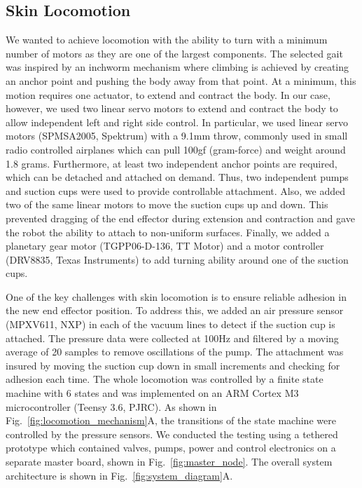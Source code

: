 \subsection{Skin Locomotion}
We wanted to achieve locomotion with the ability to turn with a minimum number of motors as they are one of the largest components. The selected gait was inspired by an inchworm mechanism where climbing is achieved by creating an anchor point and pushing the body away from that point. At a minimum, this motion requires one actuator, to extend and contract the body. In our case, however, we used two linear servo motors to extend and contract the body to allow independent left and right side control. In particular, we used linear servo motors (SPMSA2005, Spektrum) with a 9.1mm throw, commonly used in small radio controlled airplanes which can pull 100gf (gram-force) and weight around 1.8 grams. Furthermore, at least two independent anchor points are required, which can be detached and attached on demand. Thus, two independent pumps and suction cups were used to provide controllable attachment. Also, we added two of the same linear motors to move the suction cups up and down. This prevented dragging of the end effector during extension and contraction and gave the robot the ability to attach to non-uniform surfaces. Finally, we added a planetary gear motor (TGPP06-D-136, TT Motor) and a motor controller (DRV8835, Texas Instruments) to add turning ability around one of the suction cups. 

One of the key challenges with skin locomotion is to ensure reliable adhesion in the new end effector position. To address this, we added an air pressure sensor (MPXV611, NXP) in each of the vacuum lines to detect if the suction cup is attached. The pressure data were collected at 100Hz and filtered by a moving average of 20 samples to remove oscillations of the pump. The attachment was insured by moving the suction cup down in small increments and checking for adhesion each time. The whole locomotion was controlled by a finite state machine with 6 states and was implemented on an ARM Cortex M3 microcontroller (Teensy 3.6, PJRC). As shown in Fig.~\ref{fig:locomotion_mechanism}A, the transitions of the state machine were controlled by the pressure sensors. We conducted the testing using a tethered prototype which contained valves, pumps, power and control electronics on a separate master board, shown in Fig.~\ref{fig:master_node}. The overall system architecture is shown in Fig.~\ref{fig:system_diagram}A. 

